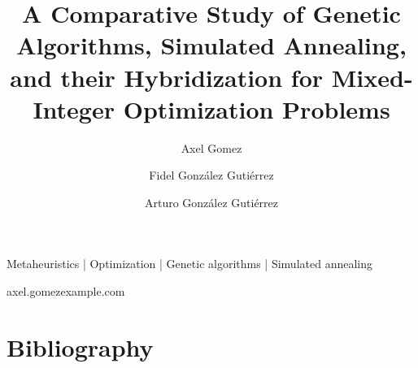 \documentclass[times, twoside]{style/axelgomez-article}
\begin{document}
\title{A Comparative Study of Genetic Algorithms, Simulated Annealing,
  and their Hybridization for Mixed-Integer Optimization Problems}




\author[1,\Letter]{Axel Gomez}
\author[2]{Fidel González Gutiérrez}
\author[3]{Arturo González Gutiérrez}




\maketitle



\begin{keywords}
Metaheuristics | Optimization | Genetic algorithms | Simulated annealing
\end{keywords}

\begin{corrauthor}
axel.gomez\at example.com
\end{corrauthor}







\section*{Bibliography}


\onecolumn
\newpage



\end{document}
